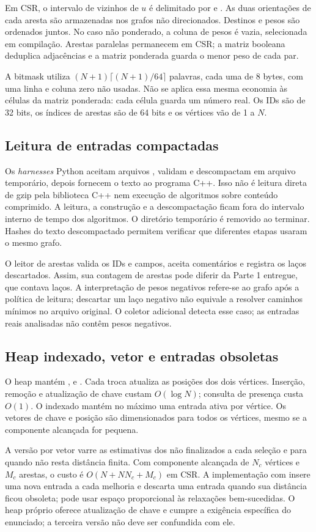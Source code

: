 \documentclass[a4paper,12pt]{article}
\newcommand{\cod}[1]{\texttt{\detokenize{#1}}}
\begin{document}
Em CSR, o intervalo de vizinhos de $u$ é delimitado por \cod{offsets[u]} e \cod{offsets[u+1]}. As duas orientações de cada aresta são armazenadas nos grafos não direcionados. Destinos e pesos são ordenados juntos. No caso não ponderado, a coluna de pesos é vazia, selecionada em compilação. Arestas paralelas permanecem em CSR; a matriz booleana deduplica adjacências e a matriz ponderada guarda o menor peso de cada par.

A bitmask utiliza $(N+1)\lceil(N+1)/64\rceil$ palavras, cada uma de 8 bytes, com uma linha e coluna zero não usadas. Não se aplica essa mesma economia às células da matriz ponderada: cada célula guarda um número real. Os IDs são de 32 bits, os índices de arestas são de 64 bits e os vértices vão de 1 a $N$.
\subsection{Leitura de entradas compactadas}
Os \emph{harnesses} Python aceitam arquivos \cod{.txt.gz}, validam e descompactam em arquivo temporário, depois fornecem o texto ao programa C++. Isso não é leitura direta de gzip pela biblioteca C++ nem execução de algoritmos sobre conteúdo comprimido. A leitura, a construção e a descompactação ficam fora do intervalo interno de tempo dos algoritmos. O diretório temporário é removido ao terminar. Hashes do texto descompactado permitem verificar que diferentes etapas usaram o mesmo grafo.

O leitor de arestas valida os IDs e campos, aceita comentários e registra os laços descartados. Assim, sua contagem de arestas pode diferir da Parte 1 entregue, que contava laços. A interpretação de pesos negativos refere-se ao grafo após a política de leitura; descartar um laço negativo não equivale a resolver caminhos mínimos no arquivo original. O coletor adicional detecta esse caso; as entradas reais analisadas não contêm pesos negativos.
\subsection{Heap indexado, vetor e entradas obsoletas}
O heap mantém \cod{heap_}, \cod{key_} e \cod{pos_}. Cada troca atualiza as posições dos dois vértices. Inserção, remoção e atualização de chave custam $O(\log N)$; consulta de presença custa $O(1)$. O indexado mantém no máximo uma entrada ativa por vértice. Os vetores de chave e posição são dimensionados para todos os vértices, mesmo se a componente alcançada for pequena.

A versão por vetor varre as estimativas dos não finalizados a cada seleção e para quando não resta distância finita. Com componente alcançada de $N_c$ vértices e $M_c$ arestas, o custo é $O(N+NN_c+M_c)$ em CSR. A implementação com \cod{std::priority_queue} insere uma nova entrada a cada melhoria e descarta uma entrada quando sua distância ficou obsoleta; pode usar espaço proporcional às relaxações bem-sucedidas. O heap próprio oferece atualização de chave e cumpre a exigência específica do enunciado; a terceira versão não deve ser confundida com ele.
\end{document}
